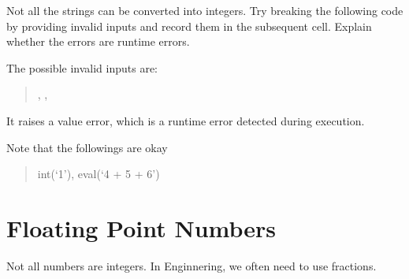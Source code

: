 \documentclass[letterpaper,10pt,english]{sphinxmanual}
\begin{document}
 Not all the strings can be converted into integers. Try breaking the following code by providing invalid inputs and record them in the subsequent cell. Explain whether the errors are runtime errors.

\begin{sphinxVerbatim}[commandchars=\\\{\}]
  
  
      
\end{sphinxVerbatim}

The possible invalid inputs are:
\begin{quote}

, , 
\end{quote}

It raises a value error, which is a runtime error detected during execution.

Note that the followings are okay
\begin{quote}

int(‘\sphinxhyphen{}1’), eval(‘4 + 5 + 6’)
\end{quote}


\section{Floating Point Numbers}
\label{\detokenize{Lecture2/Values and Variables:floating-point-numbers}}
Not all numbers are integers. In Enginnering, we often need to use fractions.


\begin{sphinxVerbatim}[commandchars=\\\{\}]
   
   
   
     
\end{sphinxVerbatim}
\end{document}
